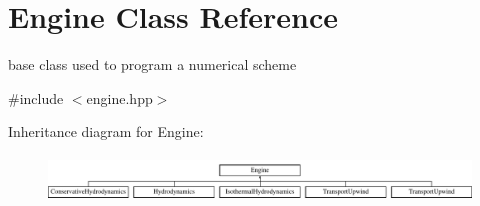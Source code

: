 \hypertarget{classEngine}{}\section{Engine Class Reference}
\label{classEngine}


base class used to program a numerical scheme  




{\ttfamily \#include $<$engine.\+hpp$>$}

Inheritance diagram for Engine\+:\begin{figure}[H]
\begin{center}
\leavevmode
\includegraphics[height=1.224044cm]{classEngine}
\end{center}
\end{figure}
